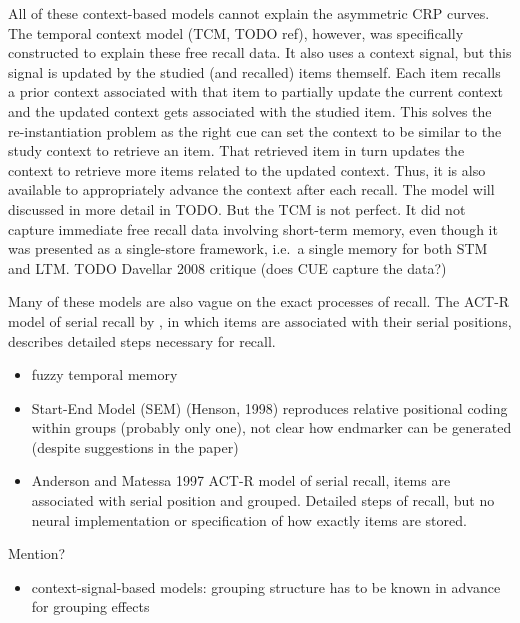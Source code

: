 All of these context-based models cannot explain the asymmetric CRP curves.
The temporal context model (TCM, TODO ref), however, was specifically constructed to explain these free recall data.
It also uses a context signal, but this signal is updated by the studied (and recalled) items themself.
Each item recalls a prior context associated with that item to partially update the current context and the updated context gets associated with the studied item.
This solves the re-instantiation problem as the right cue can set the context to be similar to the study context to retrieve an item.
That retrieved item in turn updates the context to retrieve more items related to the updated context.
Thus, it is also available to appropriately advance the context after each recall.
The model will discussed in more detail in TODO\@.
But the TCM is not perfect.
It did not capture immediate free recall data involving short-term memory, even though it was presented as a single-store framework, i.e.\ a single memory for both STM and LTM\@.
TODO Davellar 2008 critique (does CUE capture the data?)

Many of these models are also vague on the exact processes of recall.
The ACT-R model of serial recall by \textcite{Anderson1997}, in which items are associated with their serial positions, describes detailed steps necessary for recall.




\begin{itemize}
    \item fuzzy temporal memory
    \item Start-End Model (SEM) (Henson, 1998) reproduces relative positional coding within groups (probably only one), not clear how endmarker can be generated (despite suggestions in the paper)
    \item Anderson and Matessa 1997 ACT-R model of serial recall, items are associated with serial position and grouped. Detailed steps of recall, but no neural implementation or specification of how exactly items are stored.
\end{itemize}


Mention?
\begin{itemize}
    \item context-signal-based models: grouping structure has to be known in advance for grouping effects
\end{itemize}


